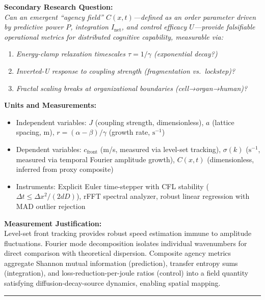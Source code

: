 \documentclass[
]{article}
\providecommand{\tightlist}{%
  \setlength{\itemsep}{0pt}\setlength{\parskip}{0pt}}
\begin{document}
\textbf{Secondary Research Question:}\\
\emph{Can an emergent ``agency field'' \(C(x,t)\)---defined as an order
parameter driven by predictive power \(P\), integration
\(I_{\text{net}}\), and control efficacy \(U\)---provide falsifiable
operational metrics for distributed cognitive capability, measurable
via:}

\begin{enumerate}
\def\labelenumi{\arabic{enumi}.}
\tightlist
\item
  \emph{Energy-clamp relaxation timescales \(\tau = 1/\gamma\)
  (exponential decay?)}
\item
  \emph{Inverted-U response to coupling strength (fragmentation
  vs.~lockstep)?}
\item
  \emph{Fractal scaling breaks at organizational boundaries
  (cell→organ→human)?}
\end{enumerate}

\textbf{Units and Measurements:}

\begin{itemize}
\tightlist
\item
  Independent variables: \(J\) (coupling strength, dimensionless), \(a\)
  (lattice spacing, m), \(r = (\alpha-\beta)/\gamma\) (growth rate,
  \(\mathrm{s}^{-1}\))
\item
  Dependent variables: \(c_{\text{front}}\) (m/s, measured via level-set
  tracking), \(\sigma(k)\) (\(\mathrm{s}^{-1}\), measured via temporal
  Fourier amplitude growth), \(C(x,t)\) (dimensionless, inferred from
  proxy composite)
\item
  Instruments: Explicit Euler time-stepper with CFL stability
  (\(\Delta t \le \Delta x^{2}/(2 d D)\)), rFFT spectral analyzer,
  robust linear regression with MAD outlier rejection
\end{itemize}

\textbf{Measurement Justification:}\\
Level-set front tracking provides robust speed estimation immune to
amplitude fluctuations. Fourier mode decomposition isolates individual
wavenumbers for direct comparison with theoretical dispersion. Composite
agency metrics aggregate Shannon mutual information (prediction),
transfer entropy sums (integration), and loss-reduction-per-joule ratios
(control) into a field quantity satisfying diffusion-decay-source
dynamics, enabling spatial mapping.

\begin{center}\rule{0.5\linewidth}{0.5pt}\end{center}
\end{document}
